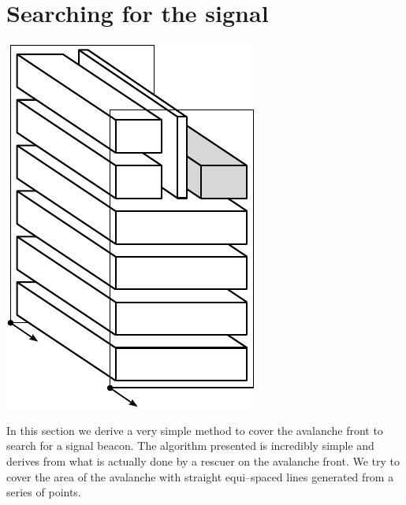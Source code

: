 \section{Searching for the signal}
\begin{marginfigure}
	\centering
	\includegraphics[scale=0.5]{ch3/img/PA_map_exploration.pdf}
\end{marginfigure}
In this section we derive a very simple method to cover the avalanche front to search for a signal beacon. The algorithm presented is incredibly simple and derives from what is actually done by a rescuer on the avalanche front. We try to cover the area of the avalanche with straight equi--spaced lines generated from a series of points.
